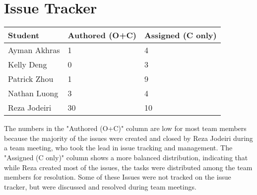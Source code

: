 \documentclass{article}
\begin{document}
\section{Issue Tracker}

\begin{table}[H]
\centering
\begin{tabular}{lll}
\toprule
\textbf{Student} & \textbf{Authored (O+C)} & \textbf{Assigned (C only)}\\
\midrule
Ayman Akhras & 1 & 4 \\
Kelly Deng & 0 & 3 \\
Patrick Zhou & 1 & 9 \\
Nathan Luong & 3 & 4 \\
Reza Jodeiri & 30 & 10 \\
\bottomrule
\end{tabular}
\end{table}

The numbers in the "Authored (O+C)" column are low for most team members because the majority of the issues were created and closed by Reza Jodeiri during a team meeting, who took the lead in issue tracking and management. The "Assigned (C only)" column shows a more balanced distribution, indicating that while Reza created most of the issues, the tasks were distributed among the team members for resolution. Some of these Issues were not tracked on the issue tracker, but were discussed and resolved during team meetings.
\end{document}
